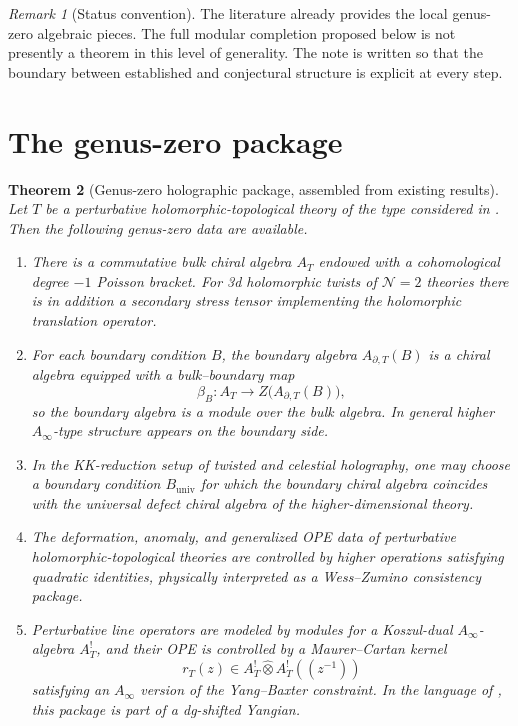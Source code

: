 \documentclass[11pt]{article}
\newtheorem{theorem}{Theorem}[section]
\theoremstyle{definition}
\theoremstyle{remark}
\newtheorem{remark}[theorem]{Remark}
\begin{document}
\begin{remark}[Status convention]
The literature already provides the local genus-zero algebraic pieces. The full modular completion proposed below is not presently a theorem in this level of generality. The note is written so that the boundary between established and conjectural structure is explicit at every step.
\end{remark}

\section{The genus-zero package}

\begin{theorem}[Genus-zero holographic package, assembled from existing results]\label{thm:genus-zero-package}
Let $T$ be a perturbative holomorphic-topological theory of the type considered in \cite{CDG2023,Zeng2024,GKW2025,KZ2025,DNP2025}. Then the following genus-zero data are available.
\begin{enumerate}[label=\textup{(\arabic*)}]
  \item There is a commutative bulk chiral algebra $A_T$ endowed with a cohomological degree $-1$ Poisson bracket. For 3d holomorphic twists of $\mathcal N=2$ theories there is in addition a secondary stress tensor implementing the holomorphic translation operator.\vspace{0.15em}
  \item For each boundary condition $B$, the boundary algebra $A_{\partial,T}(B)$ is a chiral algebra equipped with a bulk--boundary map
  \[
  \beta_B:A_T \longrightarrow Z\bigl(A_{\partial,T}(B)\bigr),
  \]
  so the boundary algebra is a module over the bulk algebra. In general higher $A_\infty$-type structure appears on the boundary side.\vspace{0.15em}
  \item In the KK-reduction setup of twisted and celestial holography, one may choose a boundary condition $B_{\mathrm{univ}}$ for which the boundary chiral algebra coincides with the universal defect chiral algebra of the higher-dimensional theory.\vspace{0.15em}
  \item The deformation, anomaly, and generalized OPE data of perturbative holomorphic-topological theories are controlled by higher operations satisfying quadratic identities, physically interpreted as a Wess--Zumino consistency package.\vspace{0.15em}
  \item Perturbative line operators are modeled by modules for a Koszul-dual $A_\infty$-algebra $A_T^!$, and their OPE is controlled by a Maurer--Cartan kernel
  \[
  r_T(z) \in A_T^! \widehat\otimes A_T^!((z^{-1}))
  \]
  satisfying an $A_\infty$ version of the Yang--Baxter constraint. In the language of \cite{DNP2025}, this package is part of a dg-shifted Yangian.
\end{enumerate}
\end{theorem}
\end{document}
